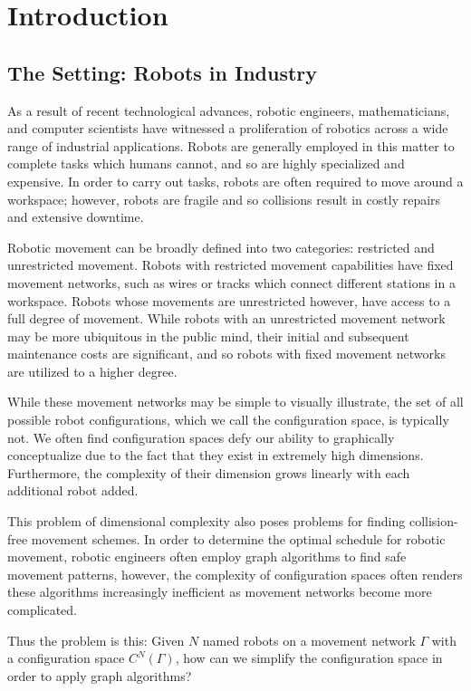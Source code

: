 \chapter{Introduction}
\section{The Setting: Robots in Industry}
As a result of recent technological advances, robotic engineers, mathematicians, and computer scientists have witnessed a proliferation of robotics across a wide range of industrial applications. Robots are generally employed in this matter to complete tasks which humans cannot, and so are highly specialized and expensive. In order to carry out tasks, robots are often required to move around a workspace; however, robots are fragile and so collisions result in costly repairs and extensive downtime.

Robotic movement can be broadly defined into two categories: restricted and unrestricted movement. Robots with restricted movement capabilities have fixed movement networks, such as wires or tracks which connect different stations in a workspace. Robots whose movements are unrestricted however, have access to a full degree of movement. While robots with an unrestricted movement network may be more ubiquitous in the public mind, their initial and subsequent maintenance costs are significant, and so robots with fixed movement networks are utilized to a higher degree. 

While these movement networks may be simple to visually illustrate, the set of all possible robot configurations, which we call the configuration space, is typically not. We often find configuration spaces defy our ability to graphically conceptualize due to the fact that they exist in extremely high dimensions. Furthermore, the complexity of their dimension grows linearly with each additional robot added.

This problem of dimensional complexity also poses problems for finding collision-free movement schemes. In order to determine the optimal schedule for robotic movement, robotic engineers often employ graph algorithms to find safe movement patterns, however, the complexity of configuration spaces often renders these algorithms increasingly inefficient as movement networks become more complicated.

Thus the problem is this: Given $N$ named robots on a movement network $\Gamma$ with a configuration space $C^N(\Gamma)$, how can we simplify the configuration space in order to apply graph algorithms?

